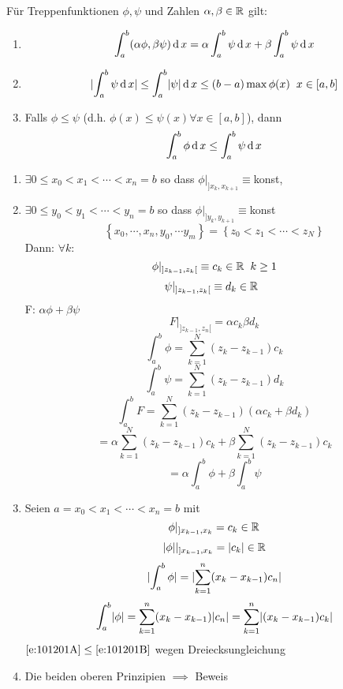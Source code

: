 \begin{Lem}
  Für Treppenfunktionen $\phi, \psi$ und Zahlen $\alpha, \beta\in\mathbb{R}$ gilt:
  \begin{enumerate}
    \item
      \[\int^b_a(\alpha\phi, \beta\psi)\operatorname{d} x=\alpha\int_a^b\psi\operatorname{d} x+\beta\int^b_a\psi\operatorname{d} x\]
    \item
      \[\mathopen| \int_a^b\psi\operatorname{d} x \mathclose|\leq \int_a^b\mathopen| \psi \mathclose|\operatorname{d} x\leq (b-a)\max \phi(x)\hspace{2mm} x\in[a,b]\]
    \item Falls $\phi\leq\psi$ (d.h. $\phi(x)\leq \psi(x)\forall x\in [a,b]$), dann
      \[\int_a^b\phi\operatorname{d} x\leq\int_a^b\psi\operatorname{d} x\]
  \end{enumerate}
\end{Lem}
\begin{Bew}
  \begin{enumerate}
    \item $\exists 0\leq x_0<x_1<\cdots<x_n=b$ so dass $\phi|_{]x_k, x_{k+1}}\equiv$konst, \item $\exists 0\leq y_0<y_1<\cdots<y_n=b$ so dass $\phi|_{]y_k, y_{k+1}}\equiv$konst
      \[\left\{ x_0,\cdots,x_n,y_0,\cdots y_m \right\}=\left\{ z_0<z_1<\cdots<z_N \right\}\]
      Dann: $\forall k:$
      \[\phi|_{]z_{k-1},z_k[}\equiv c_k\in\mathbb{R}\hspace{2mm} k\geq 1\]
      \[\psi|_{]z_{k-1},z_k[}\equiv d_k\in\mathbb{R}\hspace{2mm}\]
      F: $\alpha\phi+\beta\psi$
      \[F|_{]z_{k-1},z_n[}=\alpha c_k\beta d_k\]
      \[\int_a^b\phi=\sum_{k=1}^N(z_k-z_{k-1})c_k\]
      \[\int_a^b\psi=\sum_{k=1}^N(z_k-z_{k-1})d_k\]
      \[\int_a^bF=\sum^N_{k=1}(z_k-z_{k-1})(\alpha c_k+\beta d_k)\]
      \[=\alpha\sum_{k=1}^N(z_k-z_{k-1})c_k+\beta\sum_{k=1}^N(z_k-z_{k-1})c_k\]
      \[=\alpha\int_a^b\phi+\beta\int_a^b\psi\]
    \item
      Seien $a=x_0<x_1<\cdots<x_n=b$ mit
      \[\phi|_{]x_{k-1},x_k}=c_k\in\mathbb{R}\]
      \[\mathopen| \phi \mathclose||_{]x_{k-1},x_k}=\mathopen| c_k \mathclose|\in\mathbb{R}\]
      \begin{equation}\label{e:101201A}
        \mathopen| \int_a^b\phi \mathclose|=\mathopen| \sum^n_{k=1}(x_k-x_{k-1})c_n \mathclose|
      \end{equation}
      \begin{equation}\label{e:101201B}
        \int_a^b\mathopen| \phi \mathclose|=\sum^n_{k=1}(x_k-x_{k-1})\mathopen| c_n \mathclose|=\sum^n_{k=1}\mathopen| (x_k-x_{k-1})c_k \mathclose|
      \end{equation}
      $\ref{e:101201A}\leq\ref{e:101201B}$ wegen Dreiecksungleichung
    \item
      Die beiden oberen Prinzipien $\implies$ Beweis
  \end{enumerate}
\end{Bew}
